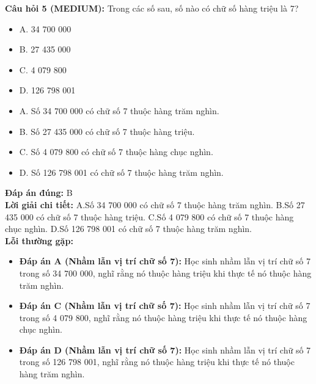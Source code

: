 \documentclass{article}
\begin{document}
\begin{minipage}{\textwidth}
\noindent\textbf{Câu hỏi 5 (MEDIUM):} Trong các số sau, số nào có chữ số hàng triệu là 7? 
\begin{itemize}[label={}]
    \item A. 34 700 000
    \item B. 27 435 000
    \item C. 4 079 800
    \item D. 126 798 001
    \item A. Số 34 700 000 có chữ số 7 thuộc hàng trăm nghìn.
    \item B. Số 27 435 000 có chữ số 7 thuộc hàng triệu.
    \item C. Số 4 079 800 có chữ số 7 thuộc hàng chục nghìn.
    \item D. Số 126 798 001 có chữ số 7 thuộc hàng trăm nghìn.
\end{itemize}
\textbf{Đáp án đúng:} B \\
\textbf{Lời giải chi tiết:} A.Số 34 700 000 có chữ số 7 thuộc hàng trăm nghìn. B.Số 27 435 000 có chữ số 7 thuộc hàng triệu. C.Số 4 079 800 có chữ số 7 thuộc hàng chục nghìn. D.Số 126 798 001 có chữ số 7 thuộc hàng trăm nghìn. \\
\textbf{Lỗi thường gặp:}
\begin{itemize}
  \item \textbf{Đáp án A (Nhầm lẫn vị trí chữ số 7):} Học sinh nhầm lẫn vị trí chữ số 7 trong số 34 700 000, nghĩ rằng nó thuộc hàng triệu khi thực tế nó thuộc hàng trăm nghìn.
  \item \textbf{Đáp án C (Nhầm lẫn vị trí chữ số 7):} Học sinh nhầm lẫn vị trí chữ số 7 trong số 4 079 800, nghĩ rằng nó thuộc hàng triệu khi thực tế nó thuộc hàng chục nghìn.
  \item \textbf{Đáp án D (Nhầm lẫn vị trí chữ số 7):} Học sinh nhầm lẫn vị trí chữ số 7 trong số 126 798 001, nghĩ rằng nó thuộc hàng triệu khi thực tế nó thuộc hàng trăm nghìn.
\end{itemize}
\end{minipage}
\vspace{1em}
\end{document}
